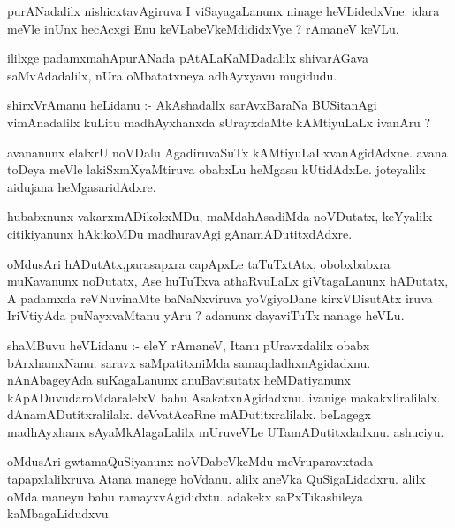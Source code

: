 \documentclass{article}
\begin{document}
\begin{mn}
purANadalilx  nishicxtavAgiruva  I  viSayagaLanunx  ninage  heVLidedxVne.  idara  meVle  inUnx  hecAcxgi  
Enu  keVLabeVkeMdididxVye ?  rAmaneV  keVLu.
\end{mn}

\begin{mn}
ililxge  padamxmahApurANada  pAtALaKaMDadalilx  shivarAGava  saMvAdadalilx,  nUra  oMbatatxneya  adhAyxyavu  mugidudu.
\end{mn}




\begin{mn}
shirxVrAmanu  heLidanu :- AkAshadallx  sarAvxBaraNa BUSitanAgi  vimAnadalilx  kuLitu  madhAyxhanxda  sUrayxdaMte  kAMtiyuLaLx  ivanAru ?
\end{mn}

\begin{mn}
avananunx  elalxrU  noVDalu  AgadiruvaSuTx  kAMtiyuLaLxvanAgidAdxne.  avana  toDeya  meVle  
lakiSxmXyaMtiruva  obabxLu  heMgasu  kUtidAdxLe. joteyalilx  aidujana  heMgasaridAdxre.
\end{mn}

\begin{mn}
hubabxnunx  vakarxmADikokxMDu,  maMdahAsadiMda  noVDutatx,  keYyalilx  citikiyanunx  hAkikoMDu  
madhuravAgi  gAnamADutitxdAdxre.
\end{mn}

\begin{mn}
oMdusAri  hADutAtx,parasapxra  capApxLe  taTuTxtAtx,  obobxbabxra  muKavanunx  noDutatx,  Ase  huTuTxva  
athaRvuLaLx  giVtagaLanunx  hADutatx,  A  padamxda  reVNuvinaMte  baNaNxviruva  yoVgiyoDane  kirxVDisutAtx  
iruva  IriVtiyAda  puNayxvaMtanu  yAru ?  adanunx  dayaviTuTx  nanage  heVLu.
\end{mn}

\begin{mn}
shaMBuvu  heVLidanu :- eleY  rAmaneV,  Itanu  pUravxdalilx  obabx  bArxhamxNanu.  saravx saMpatitxniMda  
samaqdadhxnAgidadxnu.  nAnAbageyAda  suKagaLanunx  anuBavisutatx  heMDatiyanunx  kApADuvudaroMdaralelxV  
bahu  AsakatxnAgidadxnu.  ivanige  makakxliralilalx.  dAnamADutitxralilalx.  deVvatAcaRne mADutitxralilalx.  
beLagegx  madhAyxhanx  sAyaMkAlagaLalilx  mUruveVLe  UTamADutitxdadxnu.  ashuciyu.
\end{mn}

\begin{mn}
oMdusAri  gwtamaQuSiyanunx  noVDabeVkeMdu  meVruparavxtada tapapxlalilxruva  Atana  manege  hoVdanu.  alilx  
aneVka  QuSigaLidadxru.  alilx  oMda  maneyu  bahu  ramayxvAgididxtu.  adakekx  saPxTikashileya  kaMbagaLidudxvu.
\end{mn}
\end{document}
